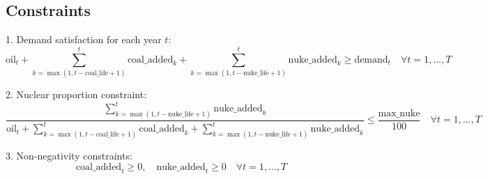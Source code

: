 \documentclass{article}
\begin{document}
\subsection*{Constraints}
1. Demand satisfaction for each year \( t \):
\[
\text{oil}_t + \sum_{k=\max(1, t-\text{coal\_life}+1)}^{t} \text{coal\_added}_k + \sum_{k=\max(1, t-\text{nuke\_life}+1)}^{t} \text{nuke\_added}_k \geq \text{demand}_t \quad \forall t = 1, \ldots, T
\]

2. Nuclear proportion constraint:
\[
\frac{\sum_{k=\max(1, t-\text{nuke\_life}+1)}^{t} \text{nuke\_added}_k}{\text{oil}_t + \sum_{k=\max(1, t-\text{coal\_life}+1)}^{t} \text{coal\_added}_k + \sum_{k=\max(1, t-\text{nuke\_life}+1)}^{t} \text{nuke\_added}_k} \leq \frac{\text{max\_nuke}}{100} \quad \forall t = 1, \ldots, T
\]

3. Non-negativity constraints:
\[
\text{coal\_added}_t \geq 0, \quad \text{nuke\_added}_t \geq 0 \quad \forall t = 1, \ldots, T
\]
\end{document}
